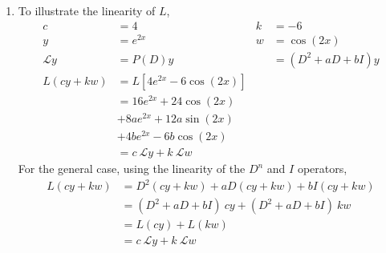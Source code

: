 \begin{enumerate}
    \item To illustrate the linearity of $ L $,
          \begin{align}
              c            & = 4                                 &
              k            & = -6                                  \\
              y            & = e^{2x}                            &
              w            & = \cos(2x)                            \\
              \mathcal{L}y & = P(D)y                             &
                           & = (D^{2} + aD + bI)y                  \\
              L(cy + kw)   & = L[4e^{2x} -6 \cos(2x)]              \\
                           & = 16e^{2x} + 24\cos (2x) \nonumber    \\
                           & + 8ae^{2x} + 12a \sin(2x) \nonumber   \\
                           & + 4be^{2x} - 6b \cos(2x)              \\
                           & = c\ \mathcal{L}y+ k\ \mathcal{L}w
          \end{align}
          For the general case, using the linearity of the $ D^{n} $ and $ I $ operators,
          \begin{align}
              L(cy + kw) & = D^{2}(cy + kw) + aD(cy + kw) + bI(cy + kw)    \\
                         & = (D^{2} + aD + bI)\ cy + (D^{2} + aD + bI)\ kw \\
                         & = L(cy) + L(kw)                                 \\
                         & = c\ \mathcal{L}y+ k\ \mathcal{L}w
          \end{align}


\end{enumerate}
